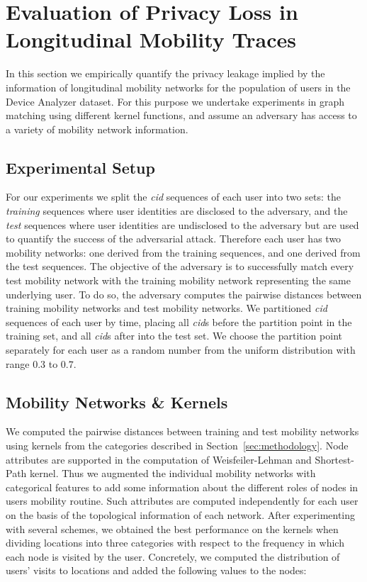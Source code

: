 \section{Evaluation of Privacy Loss in Longitudinal Mobility Traces}

In this section we empirically quantify the privacy leakage implied by the information of longitudinal mobility networks for the population of users in the Device Analyzer dataset.
For this purpose we undertake experiments in graph matching using different kernel functions, and assume an adversary has access to a variety of mobility network information.

\subsection{Experimental Setup}

For our experiments we split the \emph{cid} sequences of each user into two sets: the \emph{training} sequences where user identities are disclosed to the adversary, and the \emph{test} sequences where user identities are undisclosed to the adversary but are used to quantify the success of the adversarial attack.
Therefore each user has two mobility networks: one derived from the training sequences, and one derived from the test sequences.
The objective of the adversary is to successfully match every test mobility network with the training mobility network representing the same underlying user.
To do so, the adversary computes the pairwise distances between training mobility networks and test mobility networks.
We partitioned \emph{cid} sequences of each user by time, placing all \emph{cid}s before the partition point in the training set, and all \emph{cid}s after into the test set.
We choose the partition point separately for each user as a random number from the uniform distribution with range $ 0.3 $ to $ 0.7 $.

\subsection{Mobility Networks \& Kernels}

We computed the pairwise distances between training and test mobility networks using kernels from the categories described in Section~\ref{sec:methodology}.
Node attributes are supported in the computation of Weisfeiler-Lehman and Shortest-Path kernel.
Thus we augmented the individual mobility networks with categorical features to add some information about the different roles of nodes in users mobility routine.
Such attributes are computed independently for each user on the basis of the topological information of each network.
After experimenting with several schemes, we obtained the best performance on the kernels when dividing locations into three categories with respect to the frequency in which each node is visited by the user.
Concretely, we computed the distribution of users' visits to locations and added the following values to the nodes:

